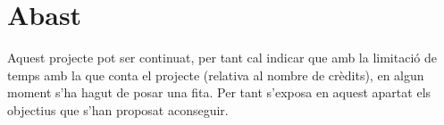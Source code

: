 \section{Abast}\label{cap:int:ab}

Aquest projecte pot ser continuat, per tant cal indicar que amb la limitació de temps amb la que conta el projecte (relativa al nombre de crèdits), en algun moment s'ha hagut de posar una fita. Per tant s'exposa en aquest apartat els objectius que s'han proposat aconseguir.


